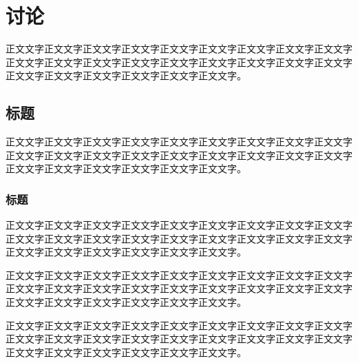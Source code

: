 \chapter{讨论}
正文文字正文文字正文文字正文文字正文文字正文文字正文文字正文文字正文文字正文文字正文文字正文文字正文文字正文文字正文文字正文文字正文文字正文文字正文文字正文文字正文文字正文文字正文文字正文文字。

\section{标题}
正文文字正文文字正文文字正文文字正文文字正文文字正文文字正文文字正文文字正文文字正文文字正文文\cite{mayWillLargeComplex1972}字正文文字正文文字正文文字正文文字正文文字正文文字正文文字正文文字正文文字正文文字正文文字正文文字。

\subsection{标题}
正文文字正文文字正文文字正文文字正文文字正文文字正文文字正文文字正文文字正文文字正文文字正文文字正文文字正文文字正文文字正文文字正文文字正文文字正文文字正文文字正文文字正文文字正文文字正文文字。

正文文字正文文字正文文字正文文字正文文字正文文字正文文字正文文字正文文字正文文字正文文字正文文字正文文字正文文字正文文字正文文字正文文字正文文字正文文字正文文字正文文字正文文字正文文字正文文字。

正文文字正文文字正文文字正文文字正文文字正文文字正文文字正文文字正文文字正文文字正文文字正文文字正文文字正文文字\cite{beltranNewTherapiesCastrationresistant2011}正文文字正文文字正文文字正文文字正文文字正文文字正文文字正文文字正文文字正文文字。
